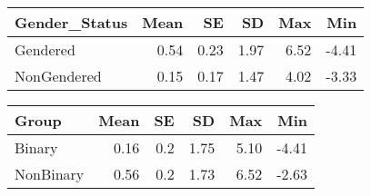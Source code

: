 \documentclass[
]{article}
\begin{document}
\begin{longtable}[]{@{}lrrrrr@{}}
\toprule()
Gender\_Status & Mean & SE & SD & Max & Min \\
\midrule()
\endhead
Gendered & 0.54 & 0.23 & 1.97 & 6.52 & -4.41 \\
NonGendered & 0.15 & 0.17 & 1.47 & 4.02 & -3.33 \\
\bottomrule()
\end{longtable}

\begin{longtable}[]{@{}lrrrrr@{}}
\toprule()
Group & Mean & SE & SD & Max & Min \\
\midrule()
\endhead
Binary & 0.16 & 0.2 & 1.75 & 5.10 & -4.41 \\
NonBinary & 0.56 & 0.2 & 1.73 & 6.52 & -2.63 \\
\bottomrule()
\end{longtable}
\end{document}
